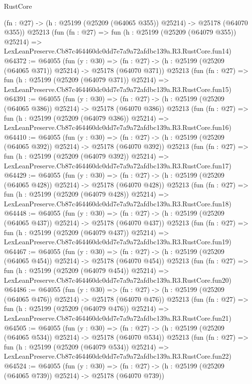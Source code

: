 \begin{lexlean}{RustCore}
\begin{coremodule}
    (fn : @27) -> (h : @25199 (@25209 (@64065 @355)) @25214) -> @25178 (@64070 @355))
    @25213
    (fun (fn : @27) =>
    fun (h : @25199 (@25209 (@64079 @355)) @25214) =>
    LexLeanPreserve.Cb87c464460dc0dd7e7a9a72afdbc139a.R3.RustCore.fun14)
@64372 := @64055
    (fun (y : @30) =>
    (fn : @27) -> (h : @25199 (@25209 (@64065 @371)) @25214) -> @25178 (@64070 @371))
    @25213
    (fun (fn : @27) =>
    fun (h : @25199 (@25209 (@64079 @371)) @25214) =>
    LexLeanPreserve.Cb87c464460dc0dd7e7a9a72afdbc139a.R3.RustCore.fun15)
@64391 := @64055
    (fun (y : @30) =>
    (fn : @27) -> (h : @25199 (@25209 (@64065 @386)) @25214) -> @25178 (@64070 @386))
    @25213
    (fun (fn : @27) =>
    fun (h : @25199 (@25209 (@64079 @386)) @25214) =>
    LexLeanPreserve.Cb87c464460dc0dd7e7a9a72afdbc139a.R3.RustCore.fun16)
@64410 := @64055
    (fun (y : @30) =>
    (fn : @27) -> (h : @25199 (@25209 (@64065 @392)) @25214) -> @25178 (@64070 @392))
    @25213
    (fun (fn : @27) =>
    fun (h : @25199 (@25209 (@64079 @392)) @25214) =>
    LexLeanPreserve.Cb87c464460dc0dd7e7a9a72afdbc139a.R3.RustCore.fun17)
@64429 := @64055
    (fun (y : @30) =>
    (fn : @27) -> (h : @25199 (@25209 (@64065 @428)) @25214) -> @25178 (@64070 @428))
    @25213
    (fun (fn : @27) =>
    fun (h : @25199 (@25209 (@64079 @428)) @25214) =>
    LexLeanPreserve.Cb87c464460dc0dd7e7a9a72afdbc139a.R3.RustCore.fun18)
@64448 := @64055
    (fun (y : @30) =>
    (fn : @27) -> (h : @25199 (@25209 (@64065 @437)) @25214) -> @25178 (@64070 @437))
    @25213
    (fun (fn : @27) =>
    fun (h : @25199 (@25209 (@64079 @437)) @25214) =>
    LexLeanPreserve.Cb87c464460dc0dd7e7a9a72afdbc139a.R3.RustCore.fun19)
@64467 := @64055
    (fun (y : @30) =>
    (fn : @27) -> (h : @25199 (@25209 (@64065 @454)) @25214) -> @25178 (@64070 @454))
    @25213
    (fun (fn : @27) =>
    fun (h : @25199 (@25209 (@64079 @454)) @25214) =>
    LexLeanPreserve.Cb87c464460dc0dd7e7a9a72afdbc139a.R3.RustCore.fun20)
@64486 := @64055
    (fun (y : @30) =>
    (fn : @27) -> (h : @25199 (@25209 (@64065 @476)) @25214) -> @25178 (@64070 @476))
    @25213
    (fun (fn : @27) =>
    fun (h : @25199 (@25209 (@64079 @476)) @25214) =>
    LexLeanPreserve.Cb87c464460dc0dd7e7a9a72afdbc139a.R3.RustCore.fun21)
@64505 := @64055
    (fun (y : @30) =>
    (fn : @27) -> (h : @25199 (@25209 (@64065 @534)) @25214) -> @25178 (@64070 @534))
    @25213
    (fun (fn : @27) =>
    fun (h : @25199 (@25209 (@64079 @534)) @25214) =>
    LexLeanPreserve.Cb87c464460dc0dd7e7a9a72afdbc139a.R3.RustCore.fun22)
@64524 := @64055
    (fun (y : @30) =>
    (fn : @27) -> (h : @25199 (@25209 (@64065 @739)) @25214) -> @25178 (@64070 @739))

\end{coremodule}
\end{lexlean}
